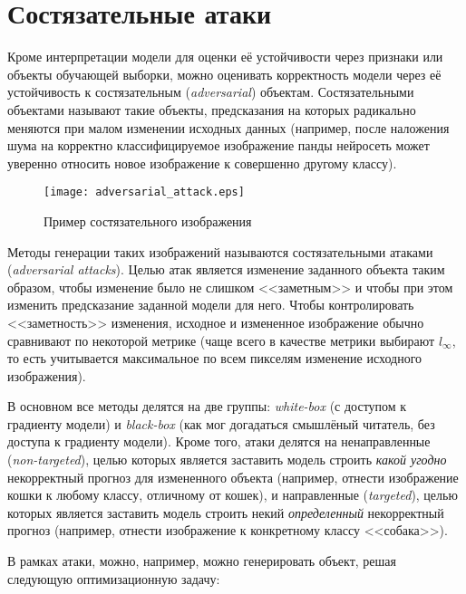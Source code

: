 \documentclass[12pt,a4paper]{article}
\begin{document}
\section{Состязательные атаки}

Кроме интерпретации модели для оценки её устойчивости через признаки или объекты обучающей выборки, можно оценивать корректность модели через её устойчивость к состязательным (\emph{adversarial}) объектам. Состязательными объектами называют такие объекты, предсказания на которых радикально меняются при малом изменении исходных данных (например, после наложения шума на корректно классифицируемое изображение панды нейросеть может уверенно относить новое изображение к совершенно другому классу).

\begin{center}
	\begin{figure}[!htb]
		\centering
		\texttt{[image: adversarial\_attack.eps]}
		\caption{Пример состязательного изображения}
	\end{figure}
\end{center}


\par Методы генерации таких изображений называются состязательными атаками (\emph{adversarial attacks}). Целью атак является изменение заданного объекта таким образом, чтобы изменение было не слишком <<заметным>> и чтобы при этом изменить предсказание заданной модели для него. Чтобы контролировать <<заметность>> изменения, исходное и измененное изображение обычно сравнивают по некоторой метрике (чаще всего в качестве метрики выбирают $l_{\infty}$, то есть учитывается максимальное по всем пикселям изменение исходного изображения).
\par В основном все методы делятся на две группы: \emph{white-box} (с доступом к градиенту модели) и \emph{black-box} (как мог догадаться смышлёный читатель, без доступа к градиенту модели). Кроме того, атаки делятся на ненаправленные (\emph{non-targeted}), целью которых является заставить модель строить \emph{какой угодно} некорректный прогноз для измененного объекта (например, отнести изображение кошки к любому классу, отличному от кошек), и направленные (\emph{targeted}), целью которых является заставить модель строить некий \emph{определенный} некорректный прогноз (например, отнести изображение к конкретному классу <<собака>>).
\newpage
\par В рамках атаки, можно, например, можно генерировать объект, решая следующую оптимизационную задачу:
\end{document}

